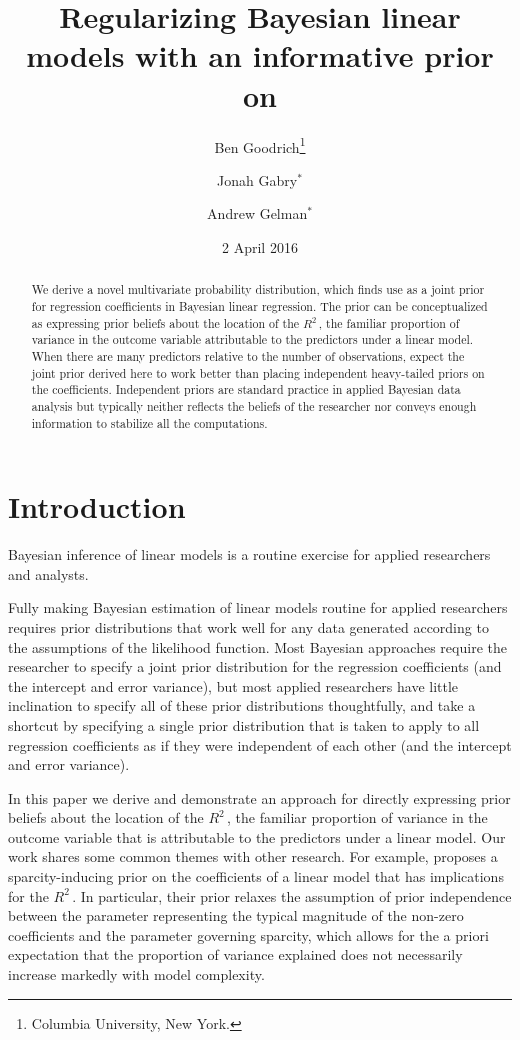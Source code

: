 \documentclass[11pt]{article}
\title{\bf Regularizing Bayesian linear models with an informative prior on \Rsq
    \vspace{.1in}}
\author{Ben Goodrich\footnote{Columbia University, New York.}
    \and Jonah Gabry$^\ast$
    \and Andrew Gelman$^\ast$
    \vspace{.1in}}
\date{2 April 2016
    \vspace{-.2in}}
\newcommand{\Rsq}{$R^2\,$}
\begin{document}
\maketitle
\thispagestyle{empty}

\begin{abstract}
\noindent We derive a novel multivariate probability distribution, which finds use as
a joint prior for regression coefficients in Bayesian linear regression. The
prior can be conceptualized as expressing prior beliefs about the location of
the \Rsq, the familiar proportion of variance in the outcome variable
attributable to the predictors under a linear model. When there are many
predictors relative to the number of observations, expect the joint prior
derived here to work better than placing independent heavy-tailed priors on the
coefficients. Independent priors are standard practice in applied Bayesian data
analysis but typically neither reflects the beliefs of the researcher nor
conveys enough information to stabilize all the computations.
\end{abstract}


\section{Introduction}

Bayesian inference of linear models is a routine exercise for 
applied researchers and analysts. 

Fully making Bayesian estimation of linear models routine for applied
researchers requires prior distributions that work well for any data generated
according to the assumptions of the likelihood function. Most Bayesian
approaches require the researcher to specify a joint prior distribution for the
regression coefficients (and the intercept and error variance), but most applied
researchers have little inclination to specify all of these prior distributions
thoughtfully, and take a shortcut by specifying a single prior distribution that
is taken to apply to all regression coefficients as if they were independent of
each other (and the intercept and error variance).

In this paper we derive and demonstrate an approach for directly expressing
prior beliefs about the location of the \Rsq, the familiar proportion of
variance in the outcome variable that is attributable to the predictors under a
linear model. Our work shares some common themes with other research. For
example,  proposes a sparcity-inducing prior on the
coefficients of a linear model that has implications for the \Rsq. In
particular, their prior relaxes the assumption of prior independence between the
parameter representing the typical magnitude of the non-zero coefficients and
the parameter governing sparcity, which allows for the a priori expectation that
the proportion of variance explained does not necessarily increase markedly with
model complexity.
\end{document}
